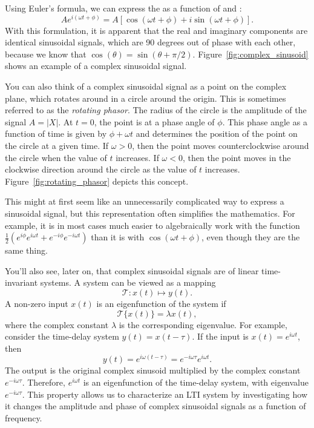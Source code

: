 Using Euler's formula, we can express the 
as a function of \index{$\cos$}{$\cos$} and \index{$\sin$}{$\sin$}:
\begin{equation}
  Ae^{i(\omega t + \phi)}= A[\cos(\omega t + \phi) + i \sin(\omega t + \phi)].
\end{equation}
With this formulation, it is apparent that the real and imaginary components are identical sinusoidal signals,
which are 90 degrees out of phase with each other, because we know that
$\cos(\theta) = \sin(\theta + \pi/2)$. Figure~\ref{fig:complex_sinusoid}
shows an example of a complex sinusoidal signal.

You can also think of a complex sinusoidal signal as a point on the complex plane,
which rotates around in a circle around the origin. This is sometimes
referred to as the \emph{rotating phasor}. The radius of the circle is the
amplitude of the signal $A=|X|$. At $t=0$, the point is at a phase angle of $\phi$.
This phase angle as a function of time is given by $\phi + \omega t$ and determines the position
of the point on the circle at a given time. If $\omega>0$, then the point moves counterclockwise
around the circle when the value of $t$ increases. If $\omega < 0$, then the point moves
in the clockwise direction around the circle as the value of $t$ increases.
Figure~\ref{fig:rotating_phasor} depicts this concept.

This might at first seem like an unnecessarily complicated way to express a sinusoidal signal,
but this representation often simplifies the mathematics. For example, it is in most cases
much easier to algebraically work with the function
$\frac{1}{2}(e^{i\phi}e^{i\omega t} + e^{-i\phi}e^{-i\omega t})$
than it is with $\cos(\omega t + \phi)$, even though they are the same thing.

You'll also see, later on, that complex sinusoidal signals are
\emph{} of linear time-invariant systems.
A system can be viewed as a mapping
\begin{equation}
  \mathcal{T}:x(t)\mapsto y(t).
\end{equation}
A non-zero input $x(t)$ is an eigenfunction of the system if
\begin{equation}
  \mathcal{T}\{x(t)\}=\lambda x(t),
\end{equation}
where the complex constant $\lambda$ is the corresponding eigenvalue.
For example, consider the time-delay system $y(t)=x(t-\tau)$. If the input is
$x(t)=e^{i\omega t}$, then
\begin{equation}
  y(t)=e^{i\omega(t-\tau)}=e^{-i\omega\tau}e^{i\omega t}.
\end{equation}
The output is the original complex sinusoid multiplied by the complex constant
$e^{-i\omega\tau}$. Therefore, $e^{i\omega t}$ is an eigenfunction of the
time-delay system, with eigenvalue $e^{-i\omega\tau}$. This property allows us
to characterize an LTI system by investigating how it changes the amplitude and
phase of complex sinusoidal signals as a function of frequency.

